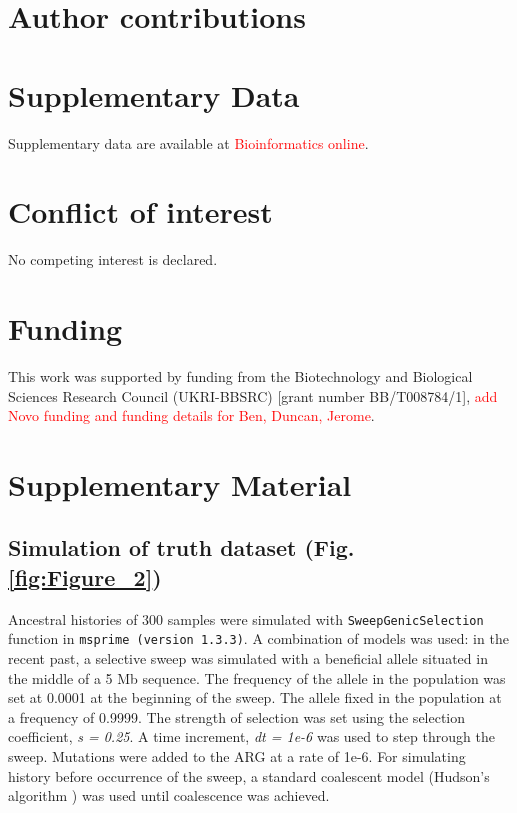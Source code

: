 \documentclass[unnumsec,webpdf,contemporary,large,namedate]{oup-authoring-template}%
\begin{document}
\section*{Author contributions}
\section*{Supplementary Data}
Supplementary data are available at \textcolor{red}{Bioinformatics online}.
\section*{Conflict of interest}
No competing interest is declared.
\section*{Funding}
This work was supported by funding from the Biotechnology and Biological Sciences Research Council (UKRI-BBSRC) [grant number BB/T008784/1], \textcolor{red}{add Novo funding and funding details for Ben, Duncan, Jerome}.



\clearpage
\onecolumn
\setcounter{figure}{0}  %
\renewcommand{\thefigure}{S\arabic{figure}}  %
\section{Supplementary Material}
\subsection{Simulation of truth dataset (Fig. \ref{fig:Figure_2})}
\label{subsec:sweep_simulation}
    Ancestral histories of 300 samples were simulated with \texttt{SweepGenicSelection} function in \texttt{msprime (version 1.3.3)}. A combination of models was used: in the recent past, a selective sweep was simulated with a beneficial allele situated in the middle of a 5 Mb sequence. The frequency of the allele in the population was set at 0.0001 at the beginning of the sweep. The allele fixed in the population at a frequency of 0.9999. The strength of selection was set using the selection coefficient, \textit{s = 0.25}. A time increment, \textit{dt = 1e-6} was used to step through the sweep. Mutations were added to the ARG at a rate of 1e-6. For simulating history before occurrence of the sweep, a standard coalescent model (Hudson's algorithm \citep{Hudson1983}) was used until coalescence was achieved. 
\end{document}
